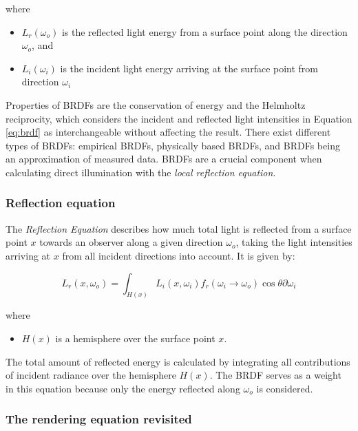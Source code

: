 \noindent where
\begin{itemize}
	\setlength\itemsep{0.05em}
	\item  $L_{r}(\omega_{o})$ is the reflected light energy from a surface point along the direction $\omega_{o}$, and
	\item  $L_{i}(\omega_{i})$ is the incident light energy arriving at the surface point from direction $\omega_{i}$ 
\end{itemize}

Properties of BRDFs are the conservation of energy and the Helmholtz reciprocity, which considers the incident and reflected light intensities in Equation \ref{eq:brdf} as interchangeable without affecting the result. There exist different types of BRDFs: empirical BRDFs, physically based BRDFs, and BRDFs being an approximation of measured data.
BRDFs are a crucial component when calculating direct illumination with the \emph{local reflection equation}.

\subsubsection{Reflection equation}

The \emph{Reflection Equation} describes how much total light is reflected from a surface point $x$ towards an observer along a given direction $\omega_{o}$, taking the light intensities arriving at $x$ from all incident directions into account. It is given by:

\begin{equation}\label{eq:local}
L_{r}(x, \omega_{o}) = \int_{H(x)} L_{i}(x, \omega_{i})f_{r}(\omega_{i} \rightarrow \omega_{o})\cos\theta\partial\omega_{i}
\end{equation}

\noindent where
\begin{itemize}
	\setlength\itemsep{0.05em}
	\item $H(x)$ is a hemisphere over the surface point $x$.
\end{itemize}
The total amount of reflected energy is calculated by integrating all contributions of incident radiance over the hemisphere $H(x)$. The BRDF serves as a weight in this equation because only the energy reflected along $\omega_{o}$ is considered.
 
\subsubsection{The rendering equation revisited}

